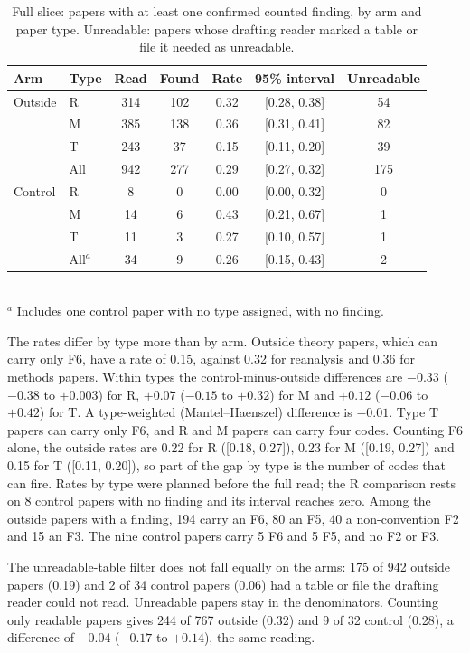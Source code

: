 \documentclass[reprint,amsmath,amssymb,aps,superscriptaddress,nofootinbib]{revtex4-2}
\begin{document}
\begin{table}[t]
\caption{Full slice: papers with at least one confirmed counted finding, by arm and paper type. Unreadable: papers whose drafting reader marked a table or file it needed as unreadable.}
\label{tab:full}
\centering\small\setlength{\tabcolsep}{2pt}
\begin{tabular}{llccccc}
\hline\hline
Arm & Type & Read & Found & Rate & 95\% interval & Unreadable \\ \hline
Outside & R & 314 & 102 & 0.32 & [0.28, 0.38] & 54 \\
 & M & 385 & 138 & 0.36 & [0.31, 0.41] & 82 \\
 & T & 243 & 37 & 0.15 & [0.11, 0.20] & 39 \\
 & All & 942 & 277 & 0.29 & [0.27, 0.32] & 175 \\ \hline
Control & R & 8 & 0 & 0.00 & [0.00, 0.32] & 0 \\
 & M & 14 & 6 & 0.43 & [0.21, 0.67] & 1 \\
 & T & 11 & 3 & 0.27 & [0.10, 0.57] & 1 \\
 & All$^a$ & 34 & 9 & 0.26 & [0.15, 0.43] & 2 \\
\hline\hline
\end{tabular}
\\[2pt]{\footnotesize $^a$ Includes one control paper with no type assigned, with no finding.}
\end{table}

The rates differ by type more than by arm. Outside theory papers, which can carry only F6, have a rate of 0.15, against 0.32 for reanalysis and 0.36 for methods papers. Within types the control-minus-outside differences are $-0.33$ ($-0.38$ to $+0.003$) for R, $+0.07$ ($-0.15$ to $+0.32$) for M and $+0.12$ ($-0.06$ to $+0.42$) for T. A type-weighted (Mantel--Haenszel) difference is $-0.01$. Type T papers can carry only F6, and R and M papers can carry four codes. Counting F6 alone, the outside rates are 0.22 for R ([0.18, 0.27]), 0.23 for M ([0.19, 0.27]) and 0.15 for T ([0.11, 0.20]), so part of the gap by type is the number of codes that can fire. Rates by type were planned before the full read; the R comparison rests on 8 control papers with no finding and its interval reaches zero. Among the outside papers with a finding, 194 carry an F6, 80 an F5, 40 a non-convention F2 and 15 an F3. The nine control papers carry 5 F6 and 5 F5, and no F2 or F3.

The unreadable-table filter does not fall equally on the arms: 175 of 942 outside papers (0.19) and 2 of 34 control papers (0.06) had a table or file the drafting reader could not read. Unreadable papers stay in the denominators. Counting only readable papers gives 244 of 767 outside (0.32) and 9 of 32 control (0.28), a difference of $-0.04$ ($-0.17$ to $+0.14$), the same reading.
\end{document}
